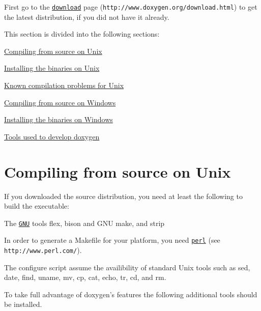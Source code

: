  First go to the \href{http://www.doxygen.org/download.html}{\tt download} page  ({\tt http://www.doxygen.org/download.html}) to get the latest distribution, if you did not have it already.

This section is divided into the following sections: 
\begin{DoxyItemize}
\item \hyperlink{install_install_src_unix}{Compiling from source on Unix} 
\item \hyperlink{install_install_bin_unix}{Installing the binaries on Unix} 
\item \hyperlink{install_unix_problems}{Known compilation problems for Unix} 
\item \hyperlink{install_install_src_windows}{Compiling from source on Windows} 
\item \hyperlink{install_install_bin_windows}{Installing the binaries on Windows} 
\item \hyperlink{install_build_tools}{Tools used to develop doxygen} 
\end{DoxyItemize}\hypertarget{install_install_src_unix}{}\section{Compiling from source on Unix}\label{install_install_src_unix}
If you downloaded the source distribution, you need at least the following to build the executable: 
\begin{DoxyItemize}
\item The \href{ftp://prep.ai.mit.edu/pub/gnu/}{\tt GNU} tools flex, bison and GNU make, and strip     
\item In order to generate a Makefile for your platform, you need \href{http://www.perl.com/}{\tt perl}  (see {\tt http://www.perl.com/}).  
\item The configure script assume the availibility of standard Unix tools such as sed, date, find, uname, mv, cp, cat, echo, tr, cd, and rm. 
\end{DoxyItemize}

To take full advantage of doxygen's features the following additional tools should be installed.


